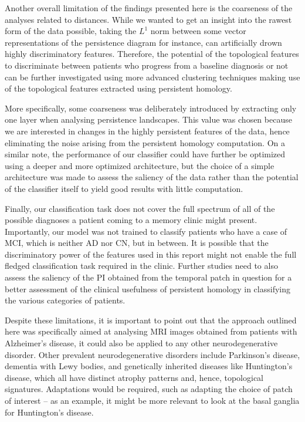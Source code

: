 \documentclass{article}
\begin{document}
Another overall limitation of the findings presented here is the coarseness of the analyses related to distances. While we wanted to get an insight into the rawest form of the data possible, taking the $L^1$ norm between some vector representations of the persistence diagram for instance, can artificially drown highly discriminatory features. Therefore, the potential of the topological features to discriminate between patients who progress from a baseline diagnosis or not can be further investigated using more advanced clustering techniques making use of the topological features extracted using persistent homology.

More specifically, some coarseness was deliberately introduced by extracting only one layer when analysing persistence landscapes. This value was chosen because we are interested in changes in the highly persistent features of the data, hence eliminating the noise arising from the persistent homology computation. On a similar note, the performance of our classifier could have further be optimized using a deeper and more optimized architecture, but the choice of a simple architecture was made to assess the saliency of the data rather than the potential of the classifier itself to yield good results with little computation.

Finally, our classification task does not cover the full spectrum of all of the possible diagnoses a patient coming to a memory clinic might present. Importantly, our model was not trained to classify patients who have a case of MCI, which is neither AD nor CN, but in between. It is possible that the discriminatory power of the features used in this report might not enable the full fledged classification task required in the clinic. Further studies need to also assess the saliency of the PI obtained from the temporal patch in question for a better assessment of the clinical usefulness of persistent homology in classifying the various categories of patients.

Despite these limitations, it is important to point out that the approach outlined here was specifically aimed at analysing  MRI images obtained from patients with Alzheimer's disease, it could also be applied to any other neurodegenerative disorder. Other prevalent neurodegenerative disorders include Parkinson's disease, dementia with Lewy bodies, and genetically inherited diseases like Huntington's disease, which all have distinct atrophy patterns and, hence, topological signatures. Adaptations would be required, such as adapting the choice of patch of interest -- as an example, it might be more relevant to look at the basal ganglia for Huntington's disease.
\end{document}
